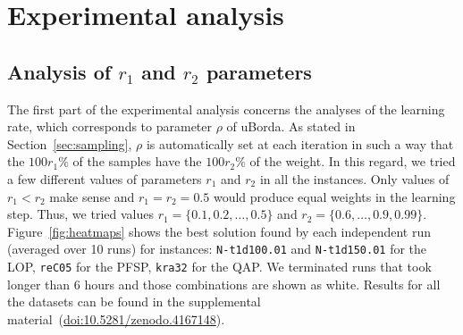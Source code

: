 \documentclass[runningheads]{llncs}
\newcommand{\supplement}{\href{http://doi.org/10.5281/zenodo.4167148}{doi:10.5281/zenodo.4167148}}
\begin{document}
\section{Experimental analysis}\label{sec:analysis}

\subsection{Analysis of $r_1$ and $r_2$ parameters}

The first part of the experimental analysis concerns the {analyses} of the learning rate, which corresponds to parameter $\rho$ of uBorda. As stated in Section~\ref{sec:sampling}, $\rho$ is automatically set at each iteration in such a way that the $100r_1\%$ of the samples have the $100r_2\%$ of the weight. In this regard, we tried a few different values of parameters $r_1$ and $r_2$ in all the instances. Only values of $r_1 < r_2$ make sense and $r_1 = r_2 = 0.5$ would produce equal weights in the learning step. Thus, we tried values $r_1 = \{0.1, 0.2, \dotsc, 0.5\}$ and $r_2 = \{0.6,\dotsc, 0.9, 0.99\}$. Figure~\ref{fig:heatmaps} shows the best solution found by each independent run (averaged over 10 runs) for instances: \texttt{N-t1d100.01} and \texttt{N-t1d150.01} for the LOP, \texttt{reC05} for the PFSP, \texttt{kra32} for the QAP. We terminated runs that took longer than 6 hours and those combinations are shown as white.  Results for all the datasets can be found in the supplemental material~(\supplement).
\end{document}
